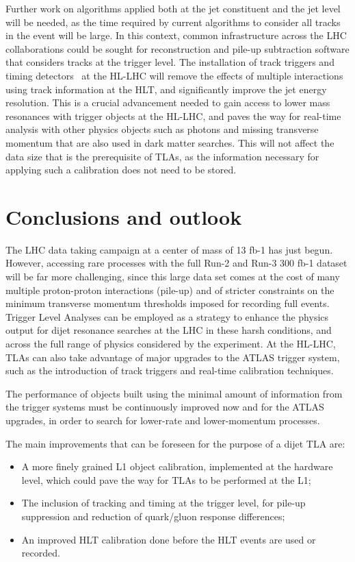 \documentclass[a4paper,justified]{tufte-handout}
\begin{document}
Further work on algorithms applied both at the jet constituent and the jet level will be needed, as the time required by current algorithms to consider all tracks in the event will be large.  In this context, common infrastructure across the LHC collaborations could be sought for reconstruction and pile-up subtraction software that considers tracks at the trigger level. 
The installation of track triggers and timing detectors~\cite{1748-0221-6-12-C12065,Martelli:2017qbe,Cerri:2016lgm,McCarthy:2016pzc} at the HL-LHC will remove the effects of multiple interactions using track information at the HLT, and significantly improve the jet energy resolution. This is a crucial advancement needed to gain access to lower mass resonances with trigger objects at the HL-LHC, and paves the way for real-time analysis with other physics objects such as photons and missing transverse momentum that are also used in dark matter searches. This will not affect the data size that is the prerequisite of TLAs, as the information necessary for applying such a calibration does not need to be stored. 

\section{Conclusions and outlook}

The LHC data taking campaign at a center of mass of 13 fb-1 has just begun. However, accessing rare processes with the full Run-2 and Run-3 300 fb-1 dataset will be far more challenging, since this large data set comes at the cost of many multiple proton-proton interactions (pile-up) and of stricter constraints on the minimum transverse momentum thresholds imposed for recording full events. Trigger Level Analyses can be employed as a strategy to enhance the physics output for dijet resonance searches at the LHC in these harsh conditions, and across the full range of physics considered by the experiment. At the HL-LHC, TLAs can also take advantage of major upgrades to the ATLAS trigger system, such as the introduction of track triggers and real-time calibration techniques. 
 
The performance of objects built using the minimal amount of information from the trigger systems must be continuously improved now and for the ATLAS upgrades, in order to search for lower-rate and lower-momentum processes.
 
The main improvements that can be foreseen for the purpose of a dijet TLA are:

\begin{itemize}
\item A more finely grained L1 object calibration, implemented at the hardware level, which could pave the way for TLAs to be performed at the L1;
\item The inclusion of tracking and timing at the trigger level, for pile-up suppression and reduction of quark/gluon response differences;
\item An improved HLT calibration done before the HLT events are used or recorded.
\end{itemize}
\end{document}
